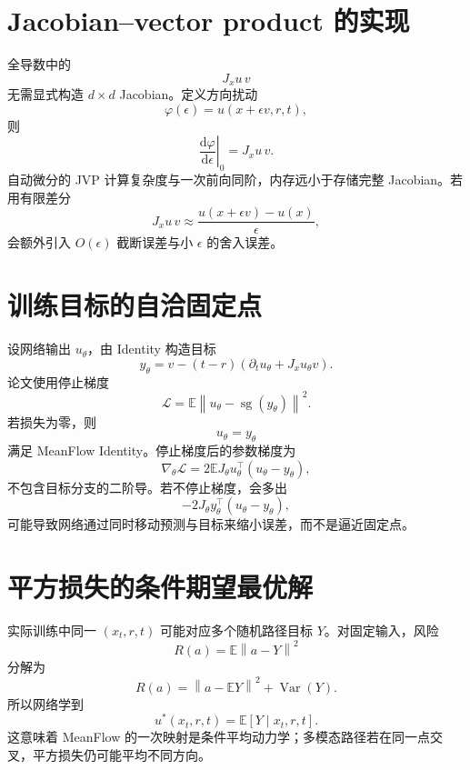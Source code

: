 \documentclass[UTF8,12pt,a4paper,fontset=none]{ctexart}
\numberwithin{equation}{section}
\newcommand{\E}{\mathbb{E}}
\newcommand{\Loss}{\mathcal{L}}
\newcommand{\norm}[1]{\left\lVert #1\right\rVert}
\newcommand{\sg}{\operatorname{sg}}
\newcommand{\dd}{\mathrm{d}}
\begin{document}
\section{Jacobian--vector product 的实现}
全导数中的
\begin{equation}
 J_xu\,v
\end{equation}
无需显式构造 $d\times d$ Jacobian。定义方向扰动
\begin{equation}
 \varphi(\epsilon)=u(x+\epsilon v,r,t),
\end{equation}
则
\begin{equation}
 \left.\frac{\dd\varphi}{\dd\epsilon}\right|_{0}=J_xu\,v.
\end{equation}
自动微分的 JVP 计算复杂度与一次前向同阶，内存远小于存储完整 Jacobian。若用有限差分
\begin{equation}
 J_xu\,v\approx\frac{u(x+\epsilon v)-u(x)}{\epsilon},
\end{equation}
会额外引入 $O(\epsilon)$ 截断误差与小 $\epsilon$ 的舍入误差。

\section{训练目标的自洽固定点}
设网络输出 $u_\theta$，由 Identity 构造目标
\begin{equation}
 y_\theta=v-(t-r)\left(\partial_tu_\theta+J_xu_\theta v\right).
\end{equation}
论文使用停止梯度
\begin{equation}
 \Loss=\E\norm{u_\theta-\sg(y_\theta)}^2.
\end{equation}
若损失为零，则
\begin{equation}
 u_\theta=y_\theta
\end{equation}
满足 MeanFlow Identity。停止梯度后的参数梯度为
\begin{equation}
 \nabla_\theta\Loss
 =2\E J_{\theta}u_\theta^\top(u_\theta-y_\theta),
\end{equation}
不包含目标分支的二阶导。若不停止梯度，会多出
\begin{equation}
 -2J_\theta y_\theta^\top(u_\theta-y_\theta),
\end{equation}
可能导致网络通过同时移动预测与目标来缩小误差，而不是逼近固定点。

\section{平方损失的条件期望最优解}
实际训练中同一 $(x_t,r,t)$ 可能对应多个随机路径目标 $Y$。对固定输入，风险
\begin{equation}
 R(a)=\E\norm{a-Y}^2
\end{equation}
分解为
\begin{equation}
 R(a)=\norm{a-\E Y}^2+\operatorname{Var}(Y).
\end{equation}
所以网络学到
\begin{equation}
 u^*(x_t,r,t)=\E[Y\mid x_t,r,t].
\end{equation}
这意味着 MeanFlow 的一次映射是条件平均动力学；多模态路径若在同一点交叉，平方损失仍可能平均不同方向。
\end{document}
